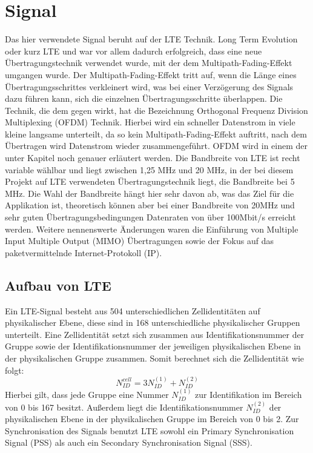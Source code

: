 \section{Signal}
Das hier verwendete Signal beruht auf der LTE Technik. Long Term Evolution oder kurz LTE und war vor allem dadurch erfolgreich, dass eine neue Übertragungstechnik verwendet wurde, mit der dem Multipath-Fading-Effekt umgangen wurde. Der Multipath-Fading-Effekt tritt auf, wenn die Länge eines Übertragungsschrittes verkleinert wird, was bei einer Verzögerung des Signals dazu führen kann, sich die einzelnen Übertragungsschritte überlappen. Die Technik, die dem gegen wirkt, hat die Bezeichnung Orthogonal Frequenz Division Multiplexing (OFDM) Technik. Hierbei wird ein schneller Datenstrom in viele kleine langsame unterteilt, da so kein Multipath-Fading-Effekt auftritt, nach dem Übertragen wird Datenstrom wieder zusammengeführt. OFDM wird in einem der unter Kapitel noch genauer erläutert werden. 
Die Bandbreite von LTE ist recht variable wählbar und liegt zwischen 1,25 MHz und 20 MHz, in der bei diesem Projekt auf LTE verwendeten Übertragungstechnik liegt, die Bandbreite bei 5 MHz. Die Wahl der Bandbreite hängt hier sehr davon ab, was das Ziel für die Applikation ist, theoretisch können aber bei einer Bandbreite von 20MHz und sehr guten Übertragungsbedingungen Datenraten von über 100Mbit/s erreicht werden. Weitere nennenswerte Änderungen waren die Einführung von Multiple Input Multiple Output (MIMO) Übertragungen sowie der Fokus auf das paketvermittelnde Internet-Protokoll (IP). \cite[S.205f]{Sauter2018}
\subsection{Aufbau von LTE}
Ein LTE-Signal besteht aus 504 unterschiedlichen Zellidentitäten auf physikalischer Ebene, diese sind in 168 unterschiedliche physikalischer Gruppen unterteilt. Eine Zellidentität setzt sich zusammen aus Identifikationsnummer der Gruppe sowie der Identifikationsnummer der jeweiligen physikalischen Ebene in der physikalischen Gruppe zusammen. Somit berechnet sich die Zellidentität wie folgt: $$N_{ID}^{cell}=3N_{ID}^{(1)}+N_{ID}^{(2)}$$ Hierbei gilt, dass jede Gruppe eine Nummer $N_{ID}^{(1)}$ zur Identifikation im Bereich von 0 bis 167 besitzt. Außerdem liegt die Identifikationsnummer $N_{ID}^{(2)}$ der physikalischen Ebene in der physikalischen Gruppe im Bereich von 0 bis 2.
Zur Synchronisation des Signals benutzt LTE sowohl ein Primary Synchronisation Signal (PSS) als auch ein Secondary Synchronisation Signal (SSS).~\cite[S.~180]{etsi2021136}

